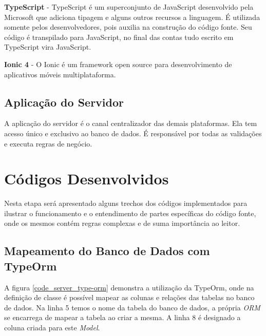 {\textbf{TypeScript} - TypeScript é um superconjunto de JavaScript desenvolvido pela Microsoft que adiciona tipagem e alguns outros recursos a linguagem. É utilizada somente pelos desenvolvedores, pois auxilia na construção do código fonte. Seu código é transpilado para JavaScript, no final das contas tudo escrito em TypeScript vira JavaScript.}

{\textbf{Ionic 4} - O Ionic é um framework open source para desenvolvimento de aplicativos móveis multiplataforma.}

\subsection{Aplicação do Servidor}
A aplicação do servidor é o canal centralizador das demais plataformas. Ela tem acesso único e exclusivo ao banco de dados. É responsável por todas as validações e executa regras de negócio.

\section{Códigos Desenvolvidos} 

Nesta etapa será apresentado alguns trechos dos códigos implementados para ilustrar o funcionamento e o entendimento de partes específicas do código fonte, onde os mesmos contém regras complexas e de suma importância ao leitor.

\subsection{Mapeamento do Banco de Dados com TypeOrm}

A figura \ref{code_server_type-orm} demonstra a utilização da TypeOrm, onde na definição de classe é possível mapear as colunas e relações das tabelas no banco de dados. Na linha 5 temos o nome da tabela do banco de dados, a própria \textit{ORM} se encarrega de mapear a tabela ao criar a mesma. A linha 8 é designado a coluna criada para este \textit{Model}.

